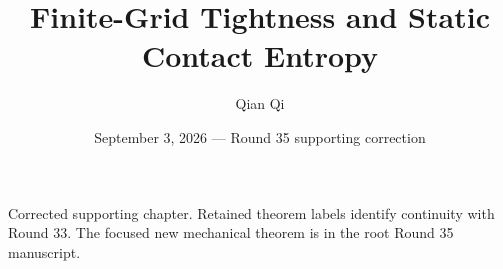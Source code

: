 \documentclass[10pt,reqno]{amsart}
\title{Finite-Grid Tightness and Static Contact Entropy}
\author{Qian Qi}
\date{September 3, 2026 --- Round 35 supporting correction}
\begin{document}
\maketitle
\noindent Corrected supporting chapter. Retained theorem labels identify continuity with Round 33. The focused new mechanical theorem is in the root Round 35 manuscript.

\end{document}
